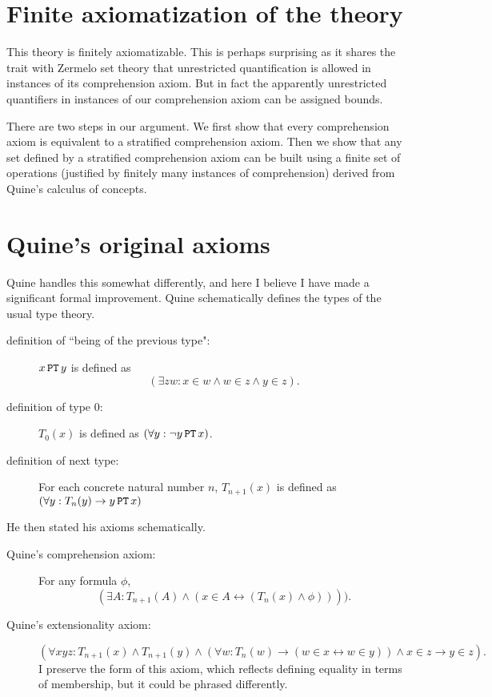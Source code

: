 \documentclass[12pt]{article}
\begin{document}
\section{Finite axiomatization of the theory}

This theory is finitely axiomatizable.  This is perhaps surprising as it shares the trait with Zermelo set theory that unrestricted quantification is allowed in instances of its comprehension axiom.  But in fact the apparently unrestricted quantifiers in instances of our comprehension axiom can be assigned bounds.

There are two steps in our argument.  We first show that every comprehension axiom is equivalent to a stratified comprehension axiom.  Then we show that any set defined by a stratified comprehension axiom can be built using a finite set of operations (justified by finitely many instances of comprehension) derived from Quine's calculus of concepts.



\section{Quine's original axioms}

Quine handles this somewhat differently, and here I believe I have made a significant formal improvement.  Quine schematically defines the types of the usual type theory.


\begin{description}

\item[definition of ``being of the previous type":]  $x\, {\tt PT}\, y$ is defined as $$(\exists zw: x \in w \wedge w \in z \wedge y \in z).$$

\item[definition of type 0:]  $T_0(x)$ is defined as $(\forall y: \neg y\, {\tt PT}\, x)$.

\item[definition of next type:]  For each concrete natural number $n$, $T_{n+1}(x)$ is
defined as $(\forall y:  T_n(y) \rightarrow y\, {\tt PT}\, x)$

\end{description}

He then stated his axioms schematically.


\begin{description}

\item[Quine's comprehension axiom:]  For any formula $\phi$, $$(\exists A:  T_{n+1}(A) \wedge (x\in A \leftrightarrow (T_n(x) \wedge  \phi)))).$$

\item[Quine's extensionality axiom:]  $$(\forall xyz:T_{n+1}(x) \wedge  T_{n+1}(y) \wedge (\forall w:T_n(w) \rightarrow (w \in x \leftrightarrow w \in y)) \wedge x \in z \rightarrow y \in z).$$  I preserve the form of this axiom, which reflects defining equality in terms of membership, but it could be phrased differently.

\end{description}
\end{document}
